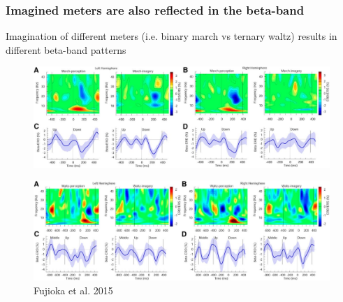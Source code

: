 \documentclass{beamer}
\begin{document}
\begin{frame}
	\frametitle{Imagined meters are also reflected in the beta-band}

	Imagination of different meters (i.e. binary march vs ternary waltz) results in different beta-band patterns

	\begin{figure}
		\centering
		\includegraphics[scale=0.85]{fig3.jpg}
	\end{figure}
	\begin{figure}
		\centering
		\includegraphics[scale=0.85]{fig4.jpg}
		\caption{Fujioka et al. 2015}
	\end{figure}

\end{frame}
\end{document}
